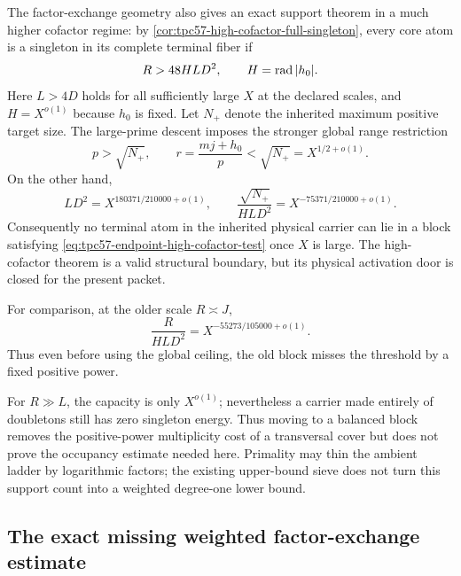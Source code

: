 The factor-exchange geometry also gives an exact support theorem in a much
higher cofactor regime: by
\cref{cor:tpc57-high-cofactor-full-singleton}, every core atom is a
singleton in its complete terminal fiber if
\begin{equation}
 R>48HLD^2,
 \qquad H=\operatorname{rad}|h_0|.
 \label{eq:tpc57-endpoint-high-cofactor-test}
\end{equation}
Here \(L>4D\) holds for all sufficiently large \(X\) at the declared
scales, and \(H=X^{o(1)}\) because \(h_0\) is fixed.  Let \(N_+\) denote
the inherited maximum positive target size.  The large-prime descent
imposes the stronger global range restriction \citep{WangTPC45}
\begin{equation}
 p>\sqrt{N_+},
 \qquad
 r=\frac{mj+h_0}{p}<\sqrt{N_+}=X^{1/2+o(1)}.
 \label{eq:tpc57-large-prime-r-ceiling}
\end{equation}
On the other hand,
\begin{equation}
 LD^2=X^{180371/210000+o(1)},
 \qquad
 \frac{\sqrt{N_+}}{HLD^2}
 =X^{-75371/210000+o(1)}.
 \label{eq:tpc57-high-cofactor-global-gap}
\end{equation}
Consequently no terminal atom in the inherited physical carrier can lie
in a block satisfying
\eqref{eq:tpc57-endpoint-high-cofactor-test} once \(X\) is large.  The
high-cofactor theorem is a valid structural boundary, but its physical
activation door is closed for the present packet.

For comparison, at the older scale \(R\asymp J\),
\begin{equation}
 \frac{R}{HLD^2}
 =X^{-55273/105000+o(1)}.
 \label{eq:tpc57-high-cofactor-endpoint-gap}
\end{equation}
Thus even before using the global ceiling, the old block misses the
threshold by a fixed positive power.

For \(R\gg L\), the capacity is only \(X^{o(1)}\); nevertheless a carrier
made entirely of doubletons still has zero singleton energy.  Thus moving
to a balanced block removes the positive-power multiplicity cost of a
transversal cover but does not prove the occupancy estimate needed here.
Primality may thin the ambient ladder by logarithmic factors; the existing
upper-bound sieve does not turn this support count into a weighted
degree-one lower bound.

\subsection{The exact missing weighted factor-exchange estimate}

